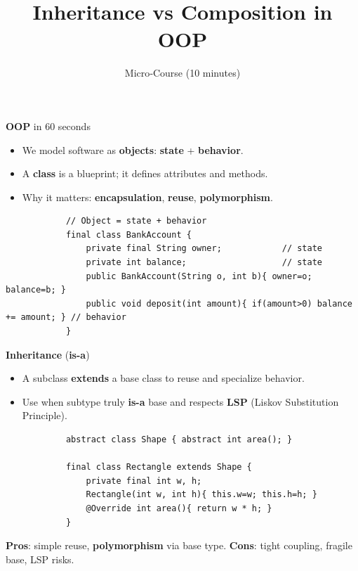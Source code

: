 \documentclass[11pt,aspectratio=169]{beamer}
\title{Inheritance vs Composition in \textbf{OOP}}
\author{Micro‑Course (10 minutes)}
\date{}
\begin{document}
	
	\begin{frame}
		\titlepage
	\end{frame}
	
	\begin{frame}[fragile]{\textbf{OOP} in 60 seconds}
		\begin{itemize}
			\item We model software as \textbf{objects}: \textbf{state} + \textbf{behavior}.
			\item A \textbf{class} is a blueprint; it defines attributes and methods.
			\item Why it matters: \textbf{encapsulation}, \textbf{reuse}, \textbf{polymorphism}.
		\end{itemize}
		\medskip
		\begin{lstlisting}
			// Object = state + behavior
			final class BankAccount {
				private final String owner;            // state
				private int balance;                   // state
				public BankAccount(String o, int b){ owner=o; balance=b; }
				public void deposit(int amount){ if(amount>0) balance += amount; } // behavior
			}
		\end{lstlisting}
	\end{frame}
	
	\begin{frame}[fragile]{\textbf{Inheritance} (\textbf{is-a})}
		\begin{itemize}
			\item A subclass \textbf{extends} a base class to reuse and specialize behavior.
			\item Use when subtype truly \textbf{is-a} base and respects \textbf{LSP} (Liskov Substitution Principle).
		\end{itemize}
		\medskip
		\begin{lstlisting}
			abstract class Shape { abstract int area(); }
			
			final class Rectangle extends Shape {
				private final int w, h;
				Rectangle(int w, int h){ this.w=w; this.h=h; }
				@Override int area(){ return w * h; }
			}
		\end{lstlisting}
		\textbf{Pros}: simple reuse, \textbf{polymorphism} via base type.
		\quad \textbf{Cons}: tight coupling, fragile base, LSP risks.
	\end{frame}
	
\end{document}
